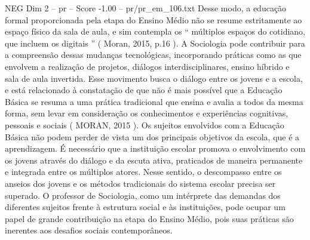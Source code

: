 \begin{textsample}{NEG Dim 2 – pr – Score -1.00 – pr/pr\_em\_106.txt}
Desse modo, a educação formal proporcionada pela etapa do Ensino Médio não se resume estritamente ao espaço físico da sala de aula, e sim contempla os “ múltiplos espaços do cotidiano, que incluem os digitais ” ( Moran, 2015, p.16 ).
A Sociologia pode contribuir para a compreensão dessas mudanças tecnológicas, incorporando práticas como as que envolvem a realização de projetos, diálogos interdisciplinares, ensino híbrido e sala de aula invertida.
Esse movimento busca o diálogo entre os jovens e a escola, e está relacionado à constatação de que não é mais possível que a Educação Básica se resuma a uma prática tradicional que ensina e avalia a todos da mesma forma, sem levar em consideração os conhecimentos e experiências cognitivas, pessoais e sociais ( MORAN, 2015 ).
Os sujeitos envolvidos com a Educação Básica não podem perder de vista um dos principais objetivos da escola, que é a aprendizagem.
É necessário que a instituição escolar promova o envolvimento com os jovens através do diálogo e da escuta ativa, praticados de maneira permanente e integrada entre os múltiplos atores.
Nesse sentido, o descompasso entre os anseios dos jovens e os métodos tradicionais do sistema escolar precisa ser superado.
O professor de Sociologia, como um intérprete das demandas dos diferentes sujeitos frente à estrutura social e às instituições, pode ocupar um papel de grande contribuição na etapa do Ensino Médio, pois suas práticas são inerentes aos desafios sociais contemporâneos.

\end{textsample}
